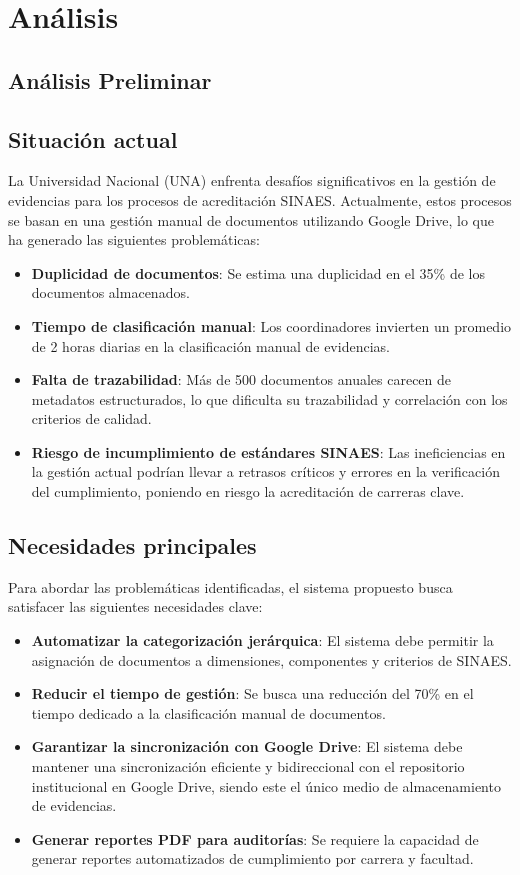 \section{Análisis}
\subsection{Análisis Preliminar}

\subsection{Situación actual}
La Universidad Nacional (UNA) enfrenta desafíos significativos en la gestión de evidencias para los procesos de acreditación SINAES. Actualmente, estos procesos se basan en una gestión manual de documentos utilizando Google Drive, lo que ha generado las siguientes problemáticas:
\begin{itemize}
    \item \textbf{Duplicidad de documentos}: Se estima una duplicidad en el 35\% de los documentos almacenados.
    \item \textbf{Tiempo de clasificación manual}: Los coordinadores invierten un promedio de 2 horas diarias en la clasificación manual de evidencias.
    \item \textbf{Falta de trazabilidad}: Más de 500 documentos anuales carecen de metadatos estructurados, lo que dificulta su trazabilidad y correlación con los criterios de calidad.
    \item \textbf{Riesgo de incumplimiento de estándares SINAES}: Las ineficiencias en la gestión actual podrían llevar a retrasos críticos y errores en la verificación del cumplimiento, poniendo en riesgo la acreditación de carreras clave.
\end{itemize}

\subsection{Necesidades principales}
Para abordar las problemáticas identificadas, el sistema propuesto busca satisfacer las siguientes necesidades clave:
\begin{itemize}
    \item \textbf{Automatizar la categorización jerárquica}: El sistema debe permitir la asignación de documentos a dimensiones, componentes y criterios de SINAES.
    \item \textbf{Reducir el tiempo de gestión}: Se busca una reducción del 70\% en el tiempo dedicado a la clasificación manual de documentos.
    \item \textbf{Garantizar la sincronización con Google Drive}: El sistema debe mantener una sincronización eficiente y bidireccional con el repositorio institucional en Google Drive, siendo este el único medio de almacenamiento de evidencias.
    \item \textbf{Generar reportes PDF para auditorías}: Se requiere la capacidad de generar reportes automatizados de cumplimiento por carrera y facultad.
\end{itemize}

